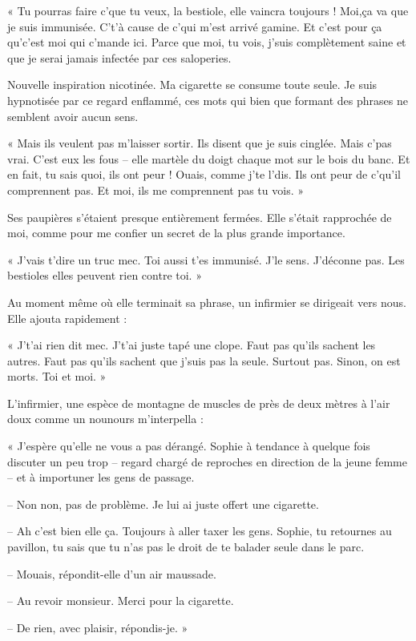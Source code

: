 « Tu pourras faire c'que tu veux, la bestiole, elle vaincra toujours ! Moi,ça va que je suis immunisée. C't'à cause de 
c'qui m'est arrivé gamine. Et c'est pour ça qu'c'est moi qui c'mande ici. Parce que moi, tu vois, j'suis complètement 
saine et que je serai jamais infectée par ces saloperies.

Nouvelle inspiration nicotinée. Ma cigarette se consume toute seule. Je suis hypnotisée par ce regard enflammé, ces 
mots qui bien que formant des phrases ne semblent avoir aucun sens.

« Mais ils veulent pas m'laisser sortir. Ils disent que je suis cinglée. Mais c'pas vrai. C'est eux les fous -- elle 
martèle du doigt chaque mot sur le bois du banc. Et en fait, tu sais quoi, ils ont peur ! Ouais, comme j'te l'dis. Ils 
ont peur de c'qu'il comprennent pas. Et moi, ils me comprennent pas tu vois. »

Ses paupières s'étaient presque entièrement fermées. Elle s'était rapprochée de moi, comme pour me confier un secret de 
la plus grande importance.

« J'vais t'dire un truc mec. Toi aussi t'es immunisé. J'le sens. J'déconne pas. Les bestioles elles peuvent rien 
contre toi. »

Au moment même où elle terminait sa phrase, un infirmier se dirigeait vers nous. Elle ajouta rapidement :

« J't'ai rien dit mec. J't'ai juste tapé une clope. Faut pas qu'ils sachent les autres. Faut pas qu'ils sachent que 
j'suis pas la seule. Surtout pas. Sinon, on est morts. Toi et moi. »

L'infirmier, une espèce de montagne de muscles de près de deux mètres à l'air doux comme un nounours m'interpella :

« J'espère qu'elle ne vous a pas dérangé. Sophie à tendance à quelque fois discuter un peu trop -- regard chargé de 
reproches en direction de la jeune femme -- et à importuner les gens de passage.

-- Non non, pas de problème. Je lui ai juste offert une cigarette.

-- Ah c'est bien elle ça. Toujours à aller taxer les gens. Sophie, tu retournes au pavillon, tu sais que tu n'as pas le 
droit de te balader seule dans le parc.

-- Mouais, répondit-elle d'un air maussade.

-- Au revoir monsieur. Merci pour la cigarette.

-- De rien, avec plaisir, répondis-je. »

